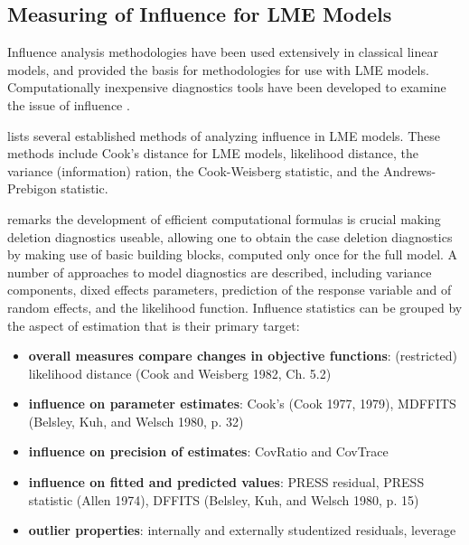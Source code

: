\documentclass[12pt, a4paper]{report}
\theoremstyle{definition}
\theoremstyle{remark}
\begin{document}

%



\subsection{Measuring of Influence for LME Models}
Influence analysis methodologies have been used extensively in classical linear models, and provided the basis for methodologies for use with LME models. Computationally inexpensive diagnostics tools have been developed to examine the issue of influence \citep{Zewotir}. 

\citet{Zewotir} lists several established methods of analyzing influence in LME models. These methods include Cook's distance for LME models,
 likelihood distance,
the variance (information) ration,
the  Cook-Weisberg statistic, and
the  Andrews-Prebigon statistic.



\citet{Zewotir} remarks the development of efficient computational formulas is crucial making deletion diagnostics useable, allowing one to obtain the  case deletion diagnostics by making use of basic building blocks, computed only once for the full model. A number of approaches to model diagnostics are described, including variance components, dixed effects parameters, prediction of the response variable and of random effects, and the likelihood function. Influence statistics can be grouped by the aspect of estimation that is their primary target:
\begin{itemize}
\item \textbf{overall measures compare changes in objective functions}: (restricted) likelihood distance (Cook and Weisberg 1982, Ch. 5.2)
\item \textbf{influence on parameter estimates}: Cook's  (Cook 1977, 1979), MDFFITS (Belsley, Kuh, and Welsch 1980, p. 32)
\item \textbf{influence on precision of estimates}: CovRatio and CovTrace
\item \textbf{influence on fitted and predicted values}: PRESS residual, PRESS statistic (Allen 1974), DFFITS (Belsley, Kuh, and Welsch 1980, p. 15)
\item \textbf{outlier properties}: internally and externally studentized residuals, leverage
\end{itemize}
\end{document}
